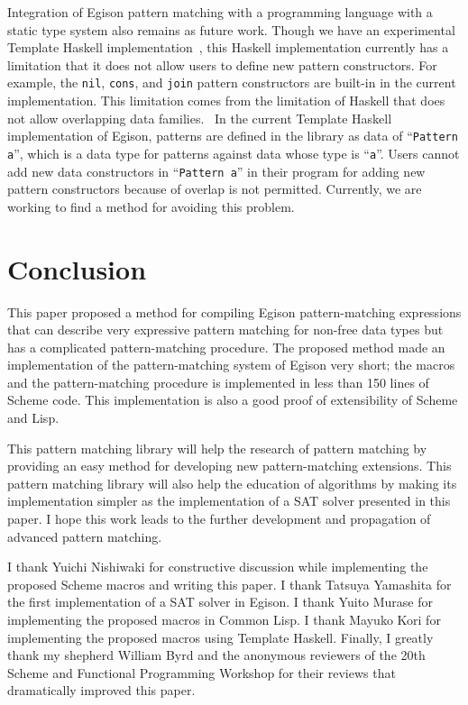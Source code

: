 \documentclass[acmlarge]{acmart}
\newcommand{\new}[1]{\textcolor{blue}{#1}}
\begin{document}
Integration of Egison pattern matching with a programming language with a static type system also remains as future work.
Though we have an experimental Template Haskell implementation~\cite{egisonHaskell}, this Haskell implementation currently has a limitation that it does not allow users to define new pattern constructors.
For example, the \lstinline{nil}, \lstinline{cons}, and \lstinline{join} pattern constructors are built-in in the current implementation.
This limitation comes from the limitation of Haskell that does not allow overlapping data families.~\cite{ghcMan}
In the current Template Haskell implementation of Egison, patterns are defined in the library as data of ``\lstinline{Pattern a}'', which is a data type for patterns against data whose type is ``\lstinline{a}''.
Users cannot add new data constructors in ``\lstinline{Pattern a}'' in their program for adding new pattern constructors because of overlap is not permitted.
Currently, we are working to find a method for avoiding this problem.


\section{Conclusion}\label{conclusion}

This paper proposed a method for compiling Egison pattern-matching expressions that can describe very expressive pattern matching for non-free data types but has a complicated pattern-matching procedure.
The proposed method made an implementation of the pattern-matching system of Egison very short; the macros and the pattern-matching procedure is implemented in less than 150 lines of Scheme code.
This implementation is also a good proof of extensibility of Scheme and Lisp.

This pattern matching library will help the research of pattern matching by providing an easy method for developing new pattern-matching extensions.
This pattern matching library will also help the education of algorithms by making its implementation simpler as the implementation of a SAT solver presented in this paper.
I hope this work leads to the further development and propagation of advanced pattern matching.

\begin{acks}
  I thank Yuichi Nishiwaki for constructive discussion while implementing the proposed Scheme macros and writing this paper.
  I thank Tatsuya Yamashita for the first implementation of a SAT solver in Egison.
  I thank Yuito Murase for implementing the proposed macros in Common Lisp.
  I thank Mayuko Kori for implementing the proposed macros using Template Haskell.
  Finally, I greatly thank my shepherd William Byrd and the anonymous reviewers of the 20th Scheme and Functional Programming Workshop for their reviews that dramatically improved this paper.
\end{acks}
\end{document}
